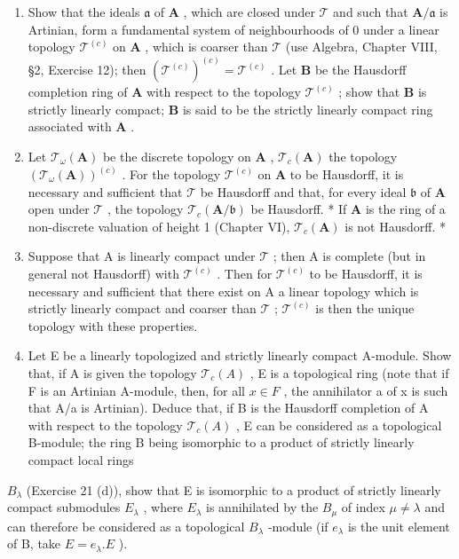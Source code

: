 \begin{enumerate}
\def\labelenumi{(\alph{enumi})}
\item
  Show that the ideals \(\mathfrak{a}\) of \(\mathbf{A}\) , which are closed under \(\mathcal{T}\) and such that \(\mathbf{A} / \mathfrak{a}\) is Artinian, form a fundamental system of neighbourhoods of 0 under a linear topology \(\mathcal{T}^{(c)}\) on \(\mathbf{A}\) , which is coarser than \(\mathcal{T}\) (use Algebra, Chapter VIII, §2, Exercise 12); then \((\mathcal{T}^{(c)})^{(c)} = \mathcal{T}^{(c)}\) . Let \(\mathbf{B}\) be the Hausdorff completion ring of \(\mathbf{A}\) with respect to the topology \(\mathcal{T}^{(c)}\) ; show that \(\mathbf{B}\) is strictly linearly compact; \(\mathbf{B}\) is said to be the strictly linearly compact ring associated with \(\mathbf{A}\) .
\item
  Let \(\mathcal{T}_{\omega}(\mathbf{A})\) be the discrete topology on \(\mathbf{A}\) , \(\mathcal{T}_c(\mathbf{A})\) the topology \((\mathcal{T}_{\omega}(\mathbf{A}))^{(c)}\) . For the topology \(\mathcal{T}^{(c)}\) on \(\mathbf{A}\) to be Hausdorff, it is necessary and sufficient that \(\mathcal{T}\) be Hausdorff and that, for every ideal \(\mathfrak{b}\) of \(\mathbf{A}\) open under \(\mathcal{T}\) , the topology \(\mathcal{T}_c(\mathbf{A}/\mathfrak{b})\) be Hausdorff. * If \(\mathbf{A}\) is the ring of a non-discrete valuation of height 1 (Chapter VI), \(\mathcal{T}_c(\mathbf{A})\) is not Hausdorff. *
\item
  Suppose that A is linearly compact under \(\mathcal{T}\) ; then A is complete (but in general not Hausdorff) with \(\mathcal{T}^{(c)}\) . Then for \(\mathcal{T}^{(c)}\) to be Hausdorff, it is necessary and sufficient that there exist on A a linear topology which is strictly linearly compact and coarser than \(\mathcal{T}\) ; \(\mathcal{T}^{(c)}\) is then the unique topology with these properties.
\item
  Let E be a linearly topologized and strictly linearly compact A-module. Show that, if A is given the topology \(\mathcal{T}_{c}(A)\) , E is a topological ring (note that if F is an Artinian A-module, then, for all \(x \in F\) , the annihilator a of x is such that A/a is Artinian). Deduce that, if B is the Hausdorff completion of A with respect to the topology \(\mathcal{T}_{c}(A)\) , E can be considered as a topological B-module; the ring B being isomorphic to a product of strictly linearly compact local rings
\end{enumerate}

\(B_{\lambda}\) (Exercise 21 (d)), show that E is isomorphic to a product of strictly linearly compact submodules \(E_{\lambda}\) , where \(E_{\lambda}\) is annihilated by the \(B_{\mu}\) of index \(\mu \neq \lambda\) and can therefore be considered as a topological \(B_{\lambda}\) -module (if \(e_{\lambda}\) is the unit element of B, take \(E = e_{\lambda}.E\) ).

